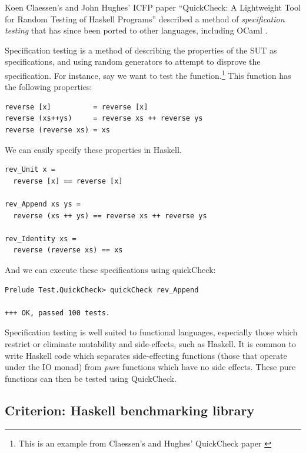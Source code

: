 Koen Claessen's and John Hughes' ICFP paper ``QuickCheck: A
Lightweight Tool for Random Testing of Haskell Programs''
\cite{claessen:quickcheck} described a method of \textit{specification
  testing} that has since been ported to other languages, including
OCaml \cite{code:ocaml-quickcheck} \cite{www:kaputt}.

Specification testing is a method of describing the properties of the
SUT as specifications, and using random generators to attempt to
disprove the specification. For instance, say we want to test the
 function.\footnote{This is an example from Claessen's
  and Hughes' QuickCheck paper \cite{claessen:quickcheck}} This
function has the following properties:

\footnotesize
\begin{verbatim}
reverse [x]          = reverse [x]
reverse (xs++ys)     = reverse xs ++ reverse ys
reverse (reverse xs) = xs
\end{verbatim}
\normalsize

We can easily specify these properties in Haskell.

\begin{lstlisting}[code=Haskell]
rev_Unit x =
  reverse [x] == reverse [x]

rev_Append xs ys =
  reverse (xs ++ ys) == reverse xs ++ reverse ys

rev_Identity xs =
  reverse (reverse xs) == xs
\end{lstlisting}

And we can execute these specifications using quickCheck:

\footnotesize
\begin{verbatim}
Prelude Test.QuickCheck> quickCheck rev_Append

+++ OK, passed 100 tests.
\end{verbatim}
\normalsize

Specification testing is well suited to functional languages,
especially those which restrict or eliminate mutability and
side-effects, such as Haskell. It is common to write Haskell code
which separates side-effecting functions (those that operate under the
IO monad) from \textit{pure} functions which have no side
effects. These pure functions can then be tested using QuickCheck. 

\subsection{Criterion: Haskell benchmarking library}

